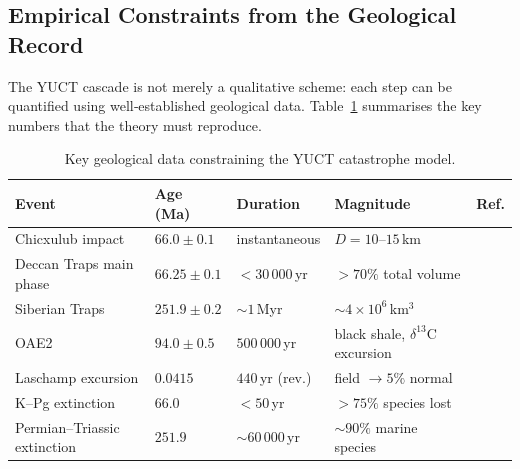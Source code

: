 \documentclass[11pt,a4paper]{article}
\begin{document}
	\subsection{Empirical Constraints from the Geological Record}
	
	The YUCT cascade is not merely a qualitative scheme: each step can be
	quantified using well‑established geological data. Table~\ref{tab:geodata}
	summarises the key numbers that the theory must reproduce.
	
	\begin{table}[H]
		\centering
		\small
		\caption{Key geological data constraining the YUCT catastrophe model.}
		\label{tab:geodata}
		\begin{tabular}{@{}p{4.2cm} p{2.6cm} p{2.8cm} p{4.2cm} p{1.2cm}@{}}
			\toprule
			\textbf{Event} & \textbf{Age (Ma)} & \textbf{Duration} & \textbf{Magnitude} & \textbf{Ref.} \\
			\midrule
			Chicxulub impact & \(66.0 \pm 0.1\) & instantaneous & \(D = 10\)–\(15\) km & \cite{Schulte2010} \\
			Deccan Traps main phase & \(66.25 \pm 0.1\) & \(<30\,000\) yr & \(>70\%\) total volume & \cite{Schoene2019} \\
			Siberian Traps & \(251.9 \pm 0.2\) & \(\sim 1\) Myr & \(\sim 4\times10^6\) km\(^3\) & \cite{SiberianTraps} \\
			OAE2 & \(94.0 \pm 0.5\) & \(500\,000\) yr & black shale, \(\delta^{13}\)C excursion & \cite{Jenkyns2010} \\
			Laschamp excursion & \(0.0415\) & \(440\) yr (rev.) & field \(\to 5\%\) normal & \cite{Laschamp} \\
			K–Pg extinction & \(66.0\) & \(<50\) yr & \(>75\%\) species lost & \cite{Schulte2010} \\
			Permian–Triassic extinction & \(251.9\) & \(\sim 60\,000\) yr & \(\sim 90\%\) marine species & \cite{Burgess2014} \\
			\bottomrule
		\end{tabular}
	\end{table}
	
\end{document}
